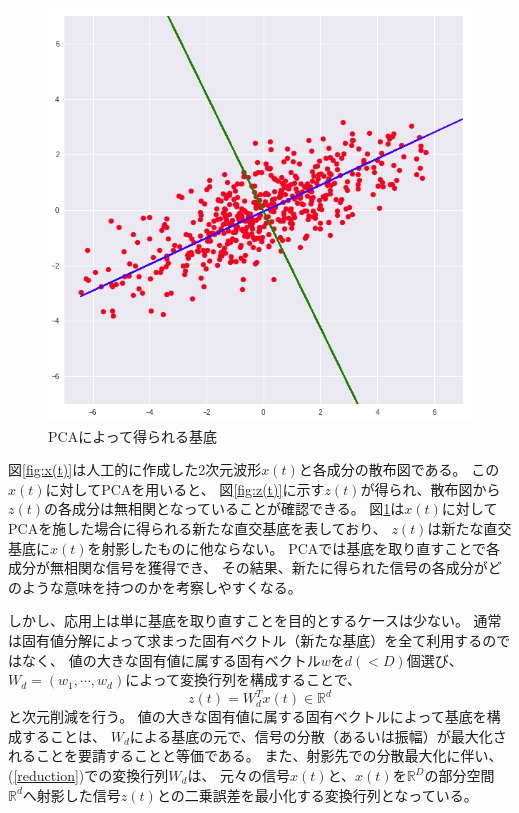 \begin{figure}
    \centering
    \includegraphics[width=12cm]{images/z=Wx.png}
    \caption{PCAによって得られる基底}
    \label{fig:z=Wx}
\end{figure}
図\ref{fig:x(t)}は人工的に作成した2次元波形\(x(t)\)と各成分の散布図である。
この\(x(t)\)に対してPCAを用いると、
図\ref{fig:z(t)}に示す\(z(t)\)が得られ、散布図から
\(z(t)\)の各成分は無相関となっていることが確認できる。
図\ref{fig:z=Wx}は\(x(t)\)に対してPCAを施した場合に得られる新たな直交基底を表しており、
\(z(t)\)は新たな直交基底に\(x(t)\)を射影したものに他ならない。
PCAでは基底を取り直すことで各成分が無相関な信号を獲得でき、
その結果、新たに得られた信号の各成分がどのような意味を持つのかを考察しやすくなる。

しかし、応用上は単に基底を取り直すことを目的とするケースは少ない。
通常は固有値分解によって求まった固有ベクトル（新たな基底）を全て利用するのではなく、
値の大きな固有値に属する固有ベクトル\(w\)を\(d(<D)\)個選び、
\(W_{d} = (w_1, \cdots, w_d)\)によって変換行列を構成することで、
\begin{equation}
    z(t)=W_{d}^Tx(t) \in \mathbb R^d
    \label{reduction}
\end{equation}
と次元削減を行う。
値の大きな固有値に属する固有ベクトルによって基底を構成することは、
\(W_d\)による基底の元で、信号の分散（あるいは振幅）が最大化されることを要請することと等価である。
また、射影先での分散最大化に伴い、(\ref{reduction})での変換行列\(W_d\)は、
元々の信号\(x(t)\)と、\(x(t)\)を\(\mathbb R^D\)の部分空間
\(\mathbb R^d\)へ射影した信号\(z(t)\)との二乗誤差を最小化する変換行列となっている。



